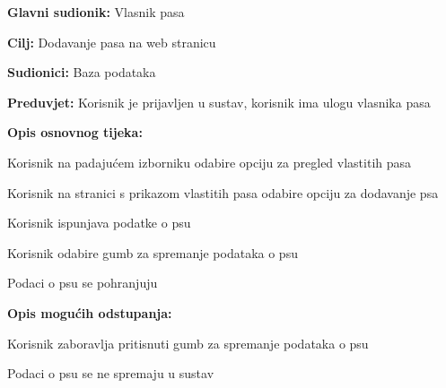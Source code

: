 					\noindent {}
					\begin{packed_item}
						
						\item \textbf{Glavni sudionik: } Vlasnik pasa
						\item  \textbf{Cilj:} Dodavanje pasa na web stranicu
						\item  \textbf{Sudionici:} Baza podataka 
						\item  \textbf{Preduvjet:} Korisnik je prijavljen u sustav, korisnik ima ulogu vlasnika pasa
						\item  \textbf{Opis osnovnog tijeka:}
						
						\item[] \begin{packed_enum}
							
							\item Korisnik na padajućem izborniku odabire opciju za pregled vlastitih pasa
							\item Korisnik na stranici s prikazom vlastitih pasa odabire opciju za dodavanje psa
							\item Korisnik ispunjava podatke o psu
							\item Korisnik odabire gumb za spremanje podataka o psu
							\item Podaci o psu se pohranjuju
							
						\end{packed_enum}
					
				
						\item  \textbf{Opis mogućih odstupanja:}
		
						\item[] \begin{packed_item}
	
							\item[4.a] Korisnik zaboravlja pritisnuti gumb za spremanje podataka o psu
							\item[] \begin{packed_enum}
								\item Podaci o psu se ne spremaju u sustav
							\end{packed_enum}
						\end{packed_item}
					\end{packed_item}
					
